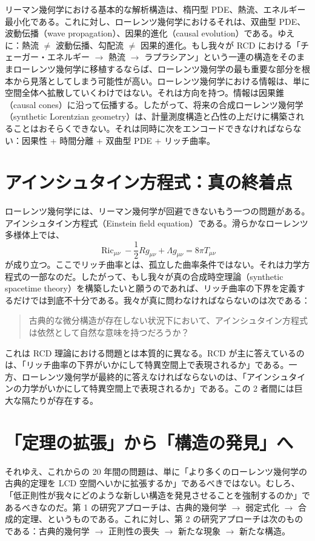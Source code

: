 \documentclass[lualatex]{ltjsarticle}
\begin{document}
リーマン幾何学における基本的な解析構造は、楕円型 PDE、熱流、エネルギー最小化である。これに対し、ローレンツ幾何学におけるそれは、双曲型 PDE、波動伝播（wave propagation）、因果的進化（causal evolution）である。ゆえに：熱流 $\neq$ 波動伝播、勾配流 $\neq$ 因果的進化。もし我々が RCD における「チェーガー・エネルギー $\longrightarrow$ 熱流 $\longrightarrow$ ラプラシアン」という一連の構造をそのままローレンツ幾何学に移植するならば、ローレンツ幾何学の最も重要な部分を根本から見落としてしまう可能性が高い。ローレンツ幾何学における情報は、単に空間全体へ拡散していくわけではない。それは方向を持つ。情報は因果錐（causal cones）に沿って伝播する。したがって、将来の合成ローレンツ幾何学（synthetic Lorentzian geometry）は、計量測度構造と凸性の上だけに構築されることはおそらくできない。それは同時に次をエンコードできなければならない：因果性 + 時間分離 + 双曲型 PDE + リッチ曲率。

\section{アインシュタイン方程式：真の終着点}

ローレンツ幾何学には、リーマン幾何学が回避できないもう一つの問題がある。アインシュタイン方程式（Einstein field equation）である。滑らかなローレンツ多様体上では、
\[
    \operatorname{Ric}_{\mu\nu} - \frac{1}{2}R g_{\mu\nu} + \Lambda g_{\mu\nu} = 8\pi T_{\mu\nu}
\]
が成り立つ。ここでリッチ曲率とは、孤立した曲率条件ではない。それは力学方程式の一部なのだ。したがって、もし我々が真の合成時空理論（synthetic spacetime theory）を構築したいと願うのであれば、リッチ曲率の下界を定義するだけでは到底不十分である。我々が真に問わなければならないのは次である：

\begin{quote}
古典的な微分構造が存在しない状況下において、アインシュタイン方程式は依然として自然な意味を持つだろうか？
\end{quote}

これは RCD 理論における問題とは本質的に異なる。RCD が主に答えているのは、「リッチ曲率の下界がいかにして特異空間上で表現されるか」である。一方、ローレンツ幾何学が最終的に答えなければならないのは、「アインシュタインの力学がいかにして特異空間上で表現されるか」である。この 2 者間には巨大な隔たりが存在する。

\section{「定理の拡張」から「構造の発見」へ}

それゆえ、これからの 20 年間の問題は、単に「より多くのローレンツ幾何学の古典的定理を LCD 空間へいかに拡張するか」であるべきではない。むしろ、「低正則性が我々にどのような新しい構造を発見させることを強制するのか」であるべきなのだ。第 1 の研究アプローチは、古典的幾何学 $\longrightarrow$ 弱定式化 $\longrightarrow$ 合成的定理、というものである。これに対し、第 2 の研究アプローチは次のものである：古典的幾何学 $\longrightarrow$ 正則性の喪失 $\longrightarrow$ 新たな現象 $\longrightarrow$ 新たな構造。
\end{document}
